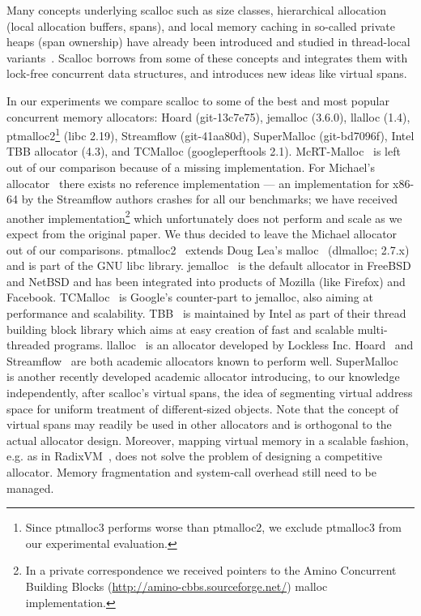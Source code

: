 \documentclass[10pt]{sigplanconf}
\begin{document}
Many concepts underlying scalloc such as size classes, hierarchical allocation
(local allocation buffers, spans), and local memory caching in so-called private
heaps (span ownership) have already been introduced and studied in thread-local
variants~\cite{Wilson:ISMM95,Berger:ASPLOS00}. Scalloc borrows from
some of these concepts and integrates them with lock-free
concurrent data structures, and introduces new ideas like virtual spans.

In our experiments we compare scalloc to some of the best and most
popular concurrent memory allocators: Hoard
(git-13c7e75), jemalloc (3.6.0), llalloc (1.4), ptmalloc2\footnote{Since ptmalloc3 performs worse than ptmalloc2, we exclude ptmalloc3
from our experimental evaluation.} (libc 2.19), Streamflow (git-41aa80d),  
SuperMalloc (git-bd7096f), Intel TBB allocator (4.3), and TCMalloc (googleperftools 2.1). 
\mbox{McRT-Malloc}~\cite{Hudson:ISMM06} is left out of our comparison because of a
missing implementation. For Michael's allocator~\cite{Michael:PLDI04} there
exists no reference implementation
--- an implementation for x86-64 by the Streamflow authors crashes for all our
benchmarks; we have received another implementation\footnote{In a private correspondence
we received pointers to the  Amino Concurrent Building Blocks
(\url{http://amino-cbbs.sourceforge.net/}) malloc
implementation.}
which unfortunately does not perform and scale as we expect from the original paper. We thus
decided to leave the Michael allocator out of our comparisons.
ptmalloc2~\cite{Gloger:ptmalloc2} extends Doug Lea's malloc~\cite{Lea:dlmalloc}
(dlmalloc; 2.7.x) and is part of the GNU libc library.
jemalloc~\cite{Evans:jemalloc} is the default allocator in FreeBSD and NetBSD
and has been integrated into products of Mozilla (like Firefox) and Facebook.
TCMalloc~\cite{tcmalloc} is Google's counter-part to jemalloc, also aiming at
performance and scalability. TBB~\cite{tbb} is maintained by Intel as part of
their thread building block library which aims at easy creation of fast and
scalable multi-threaded programs.
llalloc~\cite{llalloc} is an allocator developed by Lockless Inc.
Hoard~\cite{Berger:ASPLOS00} and
Streamflow~\cite{Schneider:ISMM06} are both academic allocators known to perform well.
SuperMalloc~\cite{Kuszmaul:ISMM15} is another recently developed academic allocator introducing, to our knowledge independently, after scalloc's virtual spans, the idea of segmenting virtual address space for
uniform treatment of different-sized objects.
Note that the concept of virtual spans may readily be used in
other allocators and is orthogonal to the actual allocator design.
Moreover, mapping virtual memory in a scalable fashion, e.g. as in
RadixVM~\cite{Clements:EuroSys13}, does not solve the problem of designing a
competitive allocator. Memory fragmentation and system-call overhead still need
to be managed.
\end{document}
